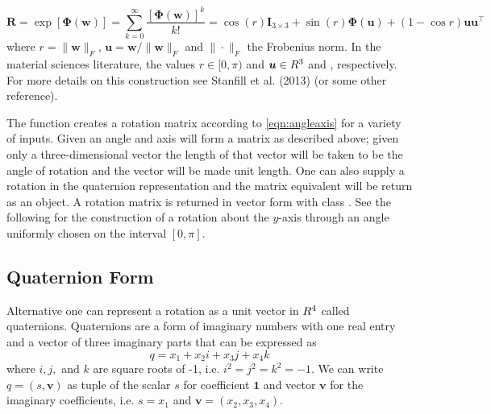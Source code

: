\begin{equation}\label{eqn:angleaxis}
  \bm R=\exp[\bm{\Phi}(\bm{w})] = \sum\limits_{k=0}^\infty \frac{[\bm{\Phi}(\bm{w})]^k}{k!}=\cos(r)\bm{I}_{3\times3} + \sin(r) \bm{\Phi}(\bm{u}) + (1-\cos r) \bm{u} \bm{u}^\top
\end{equation}
where $r=\|\bm{w}\|_F$, $\bm{u} =\bm{w}/\|\bm{w}\|_F$ and $\|\cdot\|_F$ the Frobenius norm.  In the material sciences literature, the values $r\in[0,\pi)$ and  $\bm u\in R^3$  and , respectively. For more details on this construction see Stanfill et al. (2013) (or some other reference). 

The function  creates a rotation matrix according to \eqref{eqn:angleaxis} for a variety of inputs.  Given an angle and axis  will form a matrix as described above; given only a three-dimensional vector the length of that vector will be taken to be the angle of rotation and the vector will be made unit length.  One can also supply a rotation in the quaternion representation and the matrix equivalent will be return as an  object.  A rotation matrix is returned in vector form with class .  See the following for the construction of a rotation about the $y$-axis through an angle uniformly chosen on the interval $[0,\pi]$.


\subsection{Quaternion Form}

Alternative one can represent a rotation as a unit vector in $R^4$ called quaternions.  Quaternions are a form of imaginary numbers with one real entry and a vector of three imaginary parts that can be expressed as
\[
q = x_1 + x_2 i + x_3 j + x_4 k
\]
where $i,j,$ and $k$ are square roots of -1, i.e. $i^2 = j^2= k^2 = -1$.  We can write $q=(s,\bm v)$ as tuple of the scalar $s$ for coefficient $\bm 1$ and vector $\bm v$ for the imaginary coefficients, i.e. $s=x_1$ and $\bm v= (x_2, x_3, x_4)$.

